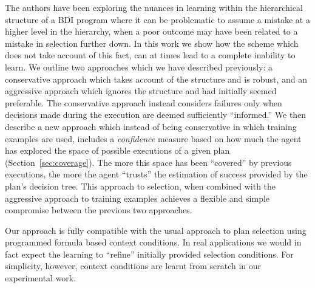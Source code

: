 The authors have been exploring the nuances in learning within the
hierarchical structure of a BDI program \cite{Airiau:IJAT09} where
it can be problematic to assume a mistake at a
higher level in the hierarchy, when a poor outcome may have been
related to a mistake in selection further down.  In this work we show
how the scheme which does not take account of this fact, can at times
lead to a complete inability to learn.
We outline two approaches which we have described previously: a conservative approach which takes account
of the structure and is robust, and an aggressive approach which
ignores the structure and had initially seemed preferable. The conservative
approach instead considers failures only when decisions made during the execution
are deemed sufficiently ``informed.''
We then describe a new approach which instead of being conservative in
which training examples are used, includes a \emph{confidence}
measure based on how much the agent has explored the space of possible
executions of a given plan (Section~\ref{sec:coverage}). The more this space has
been ``covered'' by previous executions, the more the agent ``trusts'' the
estimation of success provided by the plan's decision tree. This
approach to selection, when combined with the aggressive approach to
training examples achieves a flexible and simple
compromise between the previous two approaches.

Our approach is fully compatible with the usual approach to plan
selection using programmed formula based context conditions. In real
applications we would in fact expect the learning to ``refine''
initially provided selection conditions. 
For simplicity, however, context conditions are learnt from scratch in our
experimental work.

